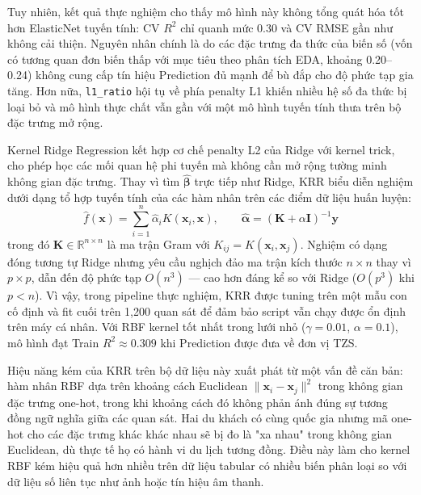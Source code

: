 Tuy nhiên, kết quả thực nghiệm cho thấy mô hình này không tổng quát hóa tốt hơn ElasticNet tuyến tính: CV $R^2$ chỉ quanh mức 0.30 và CV RMSE gần như không cải thiện. Nguyên nhân chính là do các đặc trưng đa thức của biến số (vốn có tương quan đơn biến thấp với mục tiêu theo phân tích EDA, khoảng 0.20--0.24) không cung cấp tín hiệu Prediction đủ mạnh để bù đắp cho độ phức tạp gia tăng. Hơn nữa, \texttt{l1\_ratio} hội tụ về phía penalty L1 khiến nhiều hệ số đa thức bị loại bỏ và mô hình thực chất vẫn gần với một mô hình tuyến tính thưa trên bộ đặc trưng mở rộng.


Kernel Ridge Regression kết hợp cơ chế penalty L2 của Ridge với kernel trick, cho phép học các mối quan hệ phi tuyến mà không cần mở rộng tường minh không gian đặc trưng. Thay vì tìm $\hat{\boldsymbol{\beta}}$ trực tiếp như Ridge, KRR biểu diễn nghiệm dưới dạng tổ hợp tuyến tính của các hàm nhân trên các điểm dữ liệu huấn luyện:
\begin{equation}
    \hat{f}(\mathbf{x}) = \sum_{i=1}^n \hat{\alpha}_i K(\mathbf{x}_i, \mathbf{x}), \qquad \hat{\boldsymbol{\alpha}} = (\mathbf{K} + \alpha\mathbf{I})^{-1}\mathbf{y}
\end{equation}
trong đó $\mathbf{K} \in \mathbb{R}^{n \times n}$ là ma trận Gram với $K_{ij} = K(\mathbf{x}_i, \mathbf{x}_j)$. Nghiệm có dạng đóng tương tự Ridge nhưng yêu cầu nghịch đảo ma trận kích thước $n \times n$ thay vì $p \times p$, dẫn đến độ phức tạp $O(n^3)$ --- cao hơn đáng kể so với Ridge ($O(p^3)$ khi $p < n$). Vì vậy, trong pipeline thực nghiệm, KRR được tuning trên một mẫu con cố định và fit cuối trên 1{,}200 quan sát để đảm bảo script vẫn chạy được ổn định trên máy cá nhân. Với RBF kernel tốt nhất trong lưới nhỏ ($\gamma = 0.01$, $\alpha = 0.1$), mô hình đạt Train $R^2 \approx 0.309$ khi Prediction được đưa về đơn vị TZS.

Hiệu năng kém của KRR trên bộ dữ liệu này xuất phát từ một vấn đề căn bản: hàm nhân RBF dựa trên khoảng cách Euclidean $\|\mathbf{x}_i - \mathbf{x}_j\|^2$ trong không gian đặc trưng one-hot, trong khi khoảng cách đó không phản ánh đúng sự tương đồng ngữ nghĩa giữa các quan sát. Hai du khách có cùng quốc gia nhưng mã one-hot cho các đặc trưng khác khác nhau sẽ bị đo là "xa nhau" trong không gian Euclidean, dù thực tế họ có hành vi du lịch tương đồng. Điều này làm cho kernel RBF kém hiệu quả hơn nhiều trên dữ liệu tabular có nhiều biến phân loại so với dữ liệu số liên tục như ảnh hoặc tín hiệu âm thanh.

